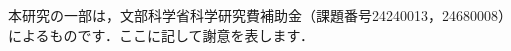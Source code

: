 \documentclass[submit,techreq]{ipsj}
\begin{document}
%

\begin{acknowledgment}
本研究の一部は，文部科学省科学研究費補助金（課題番号24240013，24680008）によるものです．ここに記して謝意を表します．
\end{acknowledgment}

\vspace{-1.0em}


\end{document}
